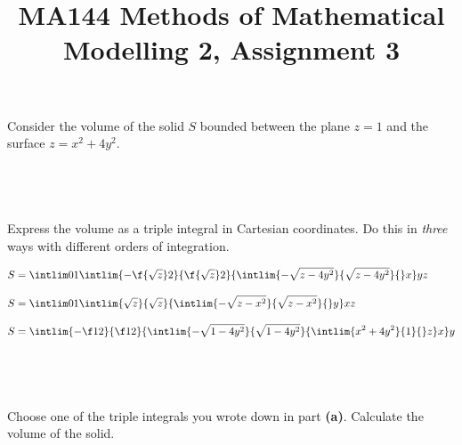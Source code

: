 \documentclass[a4paper]{article}
\title{MA144 Methods of Mathematical Modelling 2, Assignment 3}
\begin{document}
\maketitle

\setlength{\parindent}{0em}
\setlength{\parskip}{1em}


\begin{questionbody}
Consider the volume of the solid $S$ bounded between the plane $z=1$ and the surface $z = x^2 + 4y^2$.
\end{questionbody}

\subsection{~} %

\begin{questionbody}
Express the volume as a triple integral in Cartesian coordinates. Do this in \textit{three} ways with different orders of integration.
\end{questionbody}

\begin{align*}
S &= \intlim 01 {\intlim {-\f{\sqrt z}2}{\f{\sqrt z}2} {\intlim {-\sqrt{z - 4y^2}}{\sqrt{z - 4y^2}} {} x} y} z \\[2ex]
S &= \intlim 01 {\intlim {\sqrt z}{\sqrt z} {\intlim {-\sqrt{z - x^2}}{\sqrt{z - x^2}} {} y} x} z \\[2ex]
S &= \intlim {-\f12}{\f12} {\intlim {-\sqrt{1 - 4y^2}}{\sqrt{1 - 4y^2}} {\intlim {x^2 + 4y^2}{1} {} z} x} y
\end{align*}

\newpage
\subsection{~} %

\begin{questionbody}
Choose one of the triple integrals you wrote down in part \textbf{(a)}. Calculate the volume of the solid.
\end{questionbody}
\end{document}
